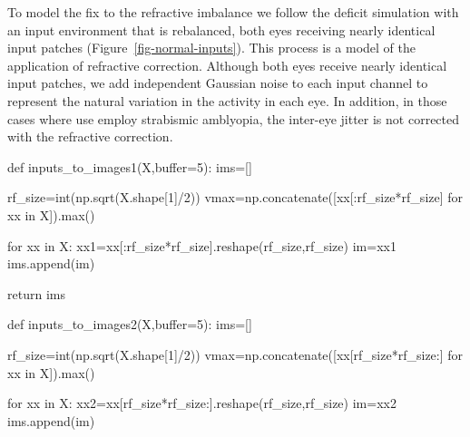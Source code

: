 \documentclass[
  letterpaper,
]{book}
\newenvironment{Shaded}{\begin{snugshade}}{\end{snugshade}}
\newcommand{\BuiltInTok}[1]{\textcolor[rgb]{0.00,0.23,0.31}{#1}}
\newcommand{\ControlFlowTok}[1]{\textcolor[rgb]{0.00,0.23,0.31}{#1}}
\newcommand{\DecValTok}[1]{\textcolor[rgb]{0.68,0.00,0.00}{#1}}
\newcommand{\KeywordTok}[1]{\textcolor[rgb]{0.00,0.23,0.31}{#1}}
\newcommand{\NormalTok}[1]{\textcolor[rgb]{0.00,0.23,0.31}{#1}}
\newcommand{\OperatorTok}[1]{\textcolor[rgb]{0.37,0.37,0.37}{#1}}
\begin{document}
To model the fix to the refractive imbalance we follow the deficit
simulation with an input environment that is rebalanced, both eyes
receiving nearly identical input patches
(Figure~\ref{fig-normal-inputs}). This process is a model of the
application of refractive correction. Although both eyes receive nearly
identical input patches, we add independent Gaussian noise to each input
channel to represent the natural variation in the activity in each eye.
In addition, in those cases where use employ strabismic amblyopia, the
inter-eye jitter is not corrected with the refractive correction.

\begin{Shaded}
\begin{Highlighting}[]
\KeywordTok{def}\NormalTok{ inputs\_to\_images1(X,}\BuiltInTok{buffer}\OperatorTok{=}\DecValTok{5}\NormalTok{):}
\NormalTok{    ims}\OperatorTok{=}\NormalTok{[]}
    
\NormalTok{    rf\_size}\OperatorTok{=}\BuiltInTok{int}\NormalTok{(np.sqrt(X.shape[}\DecValTok{1}\NormalTok{]}\OperatorTok{/}\DecValTok{2}\NormalTok{))}
\NormalTok{    vmax}\OperatorTok{=}\NormalTok{np.concatenate([xx[:rf\_size}\OperatorTok{*}\NormalTok{rf\_size] }\ControlFlowTok{for}\NormalTok{ xx }\KeywordTok{in}\NormalTok{ X]).}\BuiltInTok{max}\NormalTok{()}
    
    \ControlFlowTok{for}\NormalTok{ xx }\KeywordTok{in}\NormalTok{ X:}
\NormalTok{        xx1}\OperatorTok{=}\NormalTok{xx[:rf\_size}\OperatorTok{*}\NormalTok{rf\_size].reshape(rf\_size,rf\_size)}
\NormalTok{        im}\OperatorTok{=}\NormalTok{xx1}
\NormalTok{        ims.append(im)}
        
    \ControlFlowTok{return}\NormalTok{ ims}

\KeywordTok{def}\NormalTok{ inputs\_to\_images2(X,}\BuiltInTok{buffer}\OperatorTok{=}\DecValTok{5}\NormalTok{):}
\NormalTok{    ims}\OperatorTok{=}\NormalTok{[]}
    
\NormalTok{    rf\_size}\OperatorTok{=}\BuiltInTok{int}\NormalTok{(np.sqrt(X.shape[}\DecValTok{1}\NormalTok{]}\OperatorTok{/}\DecValTok{2}\NormalTok{))}
\NormalTok{    vmax}\OperatorTok{=}\NormalTok{np.concatenate([xx[rf\_size}\OperatorTok{*}\NormalTok{rf\_size:] }\ControlFlowTok{for}\NormalTok{ xx }\KeywordTok{in}\NormalTok{ X]).}\BuiltInTok{max}\NormalTok{()}
    
    \ControlFlowTok{for}\NormalTok{ xx }\KeywordTok{in}\NormalTok{ X:}
\NormalTok{        xx2}\OperatorTok{=}\NormalTok{xx[rf\_size}\OperatorTok{*}\NormalTok{rf\_size:].reshape(rf\_size,rf\_size)}
\NormalTok{        im}\OperatorTok{=}\NormalTok{xx2}
\NormalTok{        ims.append(im)}
        

\end{Highlighting}
\end{Shaded}
\end{document}
